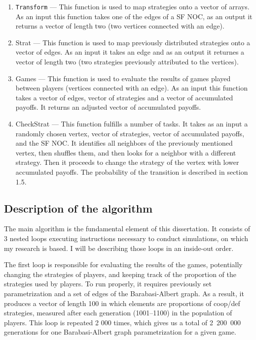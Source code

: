\documentclass[english, twoside, 12pt, a4paper]{article}
\theoremstyle{definition}
\theoremstyle{plain}
\theoremstyle{remark}
\begin{document}
\begin{enumerate}
  \item \lstinline+Transform+ --- This function is used to map strategies onto a vector of arrays. As an input this function takes one of the edges of a SF NOC,
   as an output it returns a vector of length two (two vertices connected with an edge).
  \item Strat --- This function is used to map previously distributed strategies onto a vector of edges. As an input it takes an edge and as an output
   it returnes a vector of length two (two strategies previously attributed to the vertices).
  \item Games --- This function is used to evaluate the results of games played between players (vertices connected with an edge). As an input this function
   takes a vector of edges, vector of strategies and a vector of accumulated payoffs. It returns an adjusted vector of accumulated payoffs.
  \item CheckStrat --- This function fulfills a number of tasks. It takes as an input a randomly chosen vertex, vector of strategies, vector of accumulated
  payoffs, and the SF NOC. It identifies all neighbors of the previously mentioned vertex, then shuffles them, and then looks for a neighbor
  with a different strategy. Then it proceeds to change the strategy of the vertex with lower accumulated payoffs. The probability of the transition 
  is described in section 1.5. 
\end{enumerate}

\subsection{Description of the algorithm}

The main algorithm is the fundamental element of this dissertation. It consists of 3 nested loops executing instructions necessary to conduct simulations, on which my research is based. I will be describing those loops in an inside-out order. 

The first loop is responsible for evaluating the results of the games, potentially changing the strategies of players, and keeping track of the proportion of the strategies used by players. To run properly, it requires previously set parametrization and a set of edges of the Barabasi-Albert graph. As a result, it produces a vector of length 100 in which elements are proportions of coop/def strategies, measured after each generation (1001--1100) in the population of players. This loop is repeated 2 000 times, which gives us a total of 2~200~000 generations for one Barabasi-Albert graph parametrization for a given game.
\end{document}
